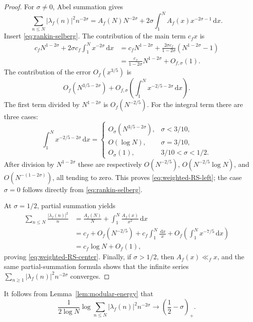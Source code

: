\documentclass[11pt]{article}
\theoremstyle{definition}
\newcommand{\dd}{\,\mathrm d}
\newcommand{\1}{\mathbf 1}
\begin{document}
\begin{proof}
For $\sigma\neq0$, Abel summation gives
\begin{equation}\label{eq:modular-Abel}
\sum_{n\le N}|\lambda_f(n)|^2n^{-2\sigma}
=A_f(N)N^{-2\sigma}
+2\sigma\int_1^NA_f(x)x^{-2\sigma-1}\dd x.
\end{equation}
Insert \eqref{eq:rankin-selberg}.  The contribution of the main term $c_fx$ is
\begin{align*}
c_fN^{1-2\sigma}
+2\sigma c_f\int_1^Nx^{-2\sigma}\dd x
&=c_fN^{1-2\sigma}
+\frac{2\sigma c_f}{1-2\sigma}(N^{1-2\sigma}-1)\\
&=\frac{c_f}{1-2\sigma}N^{1-2\sigma}
+O_{f,\sigma}(1).
\end{align*}
The contribution of the error $O_f(x^{3/5})$ is
\begin{equation}\label{eq:RS-weighted-error}
O_f(N^{3/5-2\sigma})
+O_{f,\sigma}\left(\int_1^Nx^{-2/5-2\sigma}\dd x\right).
\end{equation}
The first term divided by $N^{1-2\sigma}$ is $O_f(N^{-2/5})$.  For the integral term there are three cases:
\[
\int_1^Nx^{-2/5-2\sigma}\dd x
=
\begin{cases}
O_{\sigma}(N^{3/5-2\sigma}),&\sigma<3/10,\\
O(\log N),&\sigma=3/10,\\
O_{\sigma}(1),&3/10<\sigma<1/2.
\end{cases}
\]
After division by $N^{1-2\sigma}$ these are respectively $O(N^{-2/5})$, $O(N^{-2/5}\log N)$, and $O(N^{-(1-2\sigma)})$, all tending to zero.  This proves \eqref{eq:weighted-RS-left}; the case $\sigma=0$ follows directly from \eqref{eq:rankin-selberg}.

At $\sigma=1/2$, partial summation yields
\begin{align*}
\sum_{n\le N}\frac{|\lambda_f(n)|^2}{n}
&=\frac{A_f(N)}N+\int_1^N\frac{A_f(x)}{x^2}\dd x\\
&=c_f+O_f(N^{-2/5})
+c_f\int_1^N\frac{\dd x}{x}
+O_f\left(\int_1^Nx^{-7/5}\dd x\right)\\
&=c_f\log N+O_f(1),
\end{align*}
proving \eqref{eq:weighted-RS-center}.  Finally, if $\sigma>1/2$, then $A_f(x)\ll_fx$, and the same partial-summation formula shows that the infinite series $\sum_{n\ge1}|\lambda_f(n)|^2n^{-2\sigma}$ converges.
\end{proof}

It follows from Lemma~\ref{lem:modular-energy} that
\begin{equation}\label{eq:modular-H1}
\frac1{2\log N}
\log\sum_{n\le N}|\lambda_f(n)|^2n^{-2\sigma}
\longrightarrow
\left(\frac12-\sigma\right)_+.
\end{equation}
\end{document}
